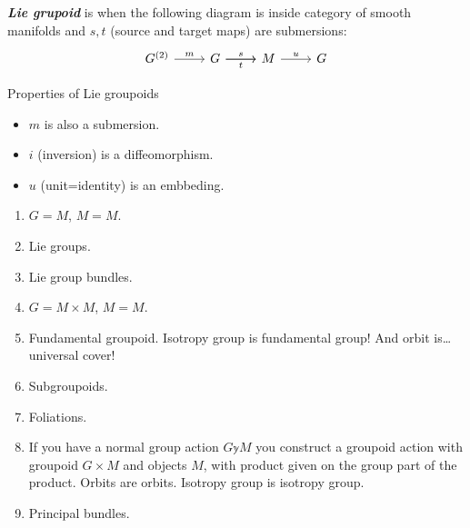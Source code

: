 \begin{defn}\leavevmode
\textit{\textbf{Lie grupoid}} is when the following diagram is inside category of smooth manifolds and \(s,t\) (source and target maps) are submersions:
\[\begin{tikzcd}
	G^{(2)}\arrow[r,"m"]& G \arrow[ r,"s"]\arrow[r,"t",swap]& M \arrow[r,"u"]& G
\end{tikzcd}\]
\end{defn}

\begin{thing6}{Properties of Lie groupoids}\leavevmode
\begin{itemize}
\item \(m\) is also a submersion.
\item \(i\) (inversion) is a diffeomorphism.
\item  \(u\) (unit=identity) is an embbeding.
\end{itemize}
\end{thing6}


\begin{example}\leavevmode
\begin{enumerate}
\item \(G=M\),  \(M=M\).
 \item Lie groups.
	\item Lie group bundles.
\item \(G=M \times M\), \(M =M\).
 \item Fundamental groupoid. Isotropy group is fundamental group! And orbit is…\clearpage universal cover!
\item Subgroupoids.
\item  Foliations.
\item If you have a normal group action \(G \mathbb{y} M\) you construct a groupoid action with groupoid \(G \times M\) and objects \(M\), with product given on the group part of the product. Orbits are orbits. Isotropy group is isotropy group.
 \item Principal bundles.
\end{enumerate}
\end{example}

